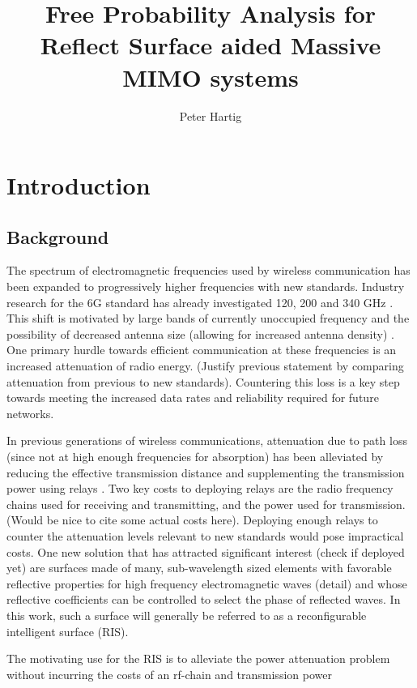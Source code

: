 \documentclass[12pt,a4paper]{report}
\title{Free Probability Analysis for Reflect Surface aided Massive MIMO systems}
\author{Peter Hartig}
\begin{document}
\maketitle
\begin{abstract}

\end{abstract}
%
\tableofcontents
\chapter{Introduction}
\section{Background}\label{Background}
The spectrum of electromagnetic frequencies used by wireless communication has been expanded to progressively higher frequencies with new standards. Industry research for the 6G standard has already investigated 120, 200 and 340 GHz \cite{Koziol}. This shift is motivated by large bands of currently unoccupied frequency
and the possibility of decreased antenna size (allowing for increased antenna density) \cite{akyildiz2018combating}. One primary hurdle towards efficient communication at these frequencies is an increased attenuation of radio energy. (Justify previous statement by comparing attenuation from previous to new standards). Countering this loss is a key step towards meeting the increased data rates and reliability required for future networks.
\par
In previous generations of wireless communications, attenuation due to path loss (since not at high enough frequencies for absorption) has been alleviated by reducing the effective transmission distance 
and supplementing the transmission power using relays \cite{dahlman20134g}. Two key costs to deploying relays are the radio frequency chains used for receiving and transmitting, and the power used for transmission. (Would be nice to cite some actual costs here). Deploying enough relays to counter
the attenuation levels relevant to new standards would pose impractical costs. One new solution that has attracted significant interest (check if deployed yet) are surfaces made of many, sub-wavelength sized elements with favorable reflective properties for high frequency electromagnetic waves (detail) and whose reflective coefficients can be controlled to select the phase of reflected waves. In this work, such a surface will generally be referred to as a reconfigurable intelligent surface (RIS).
\par
The motivating use for the RIS is to alleviate the power attenuation problem without incurring the costs of an rf-chain and transmission power 
\end{document}
